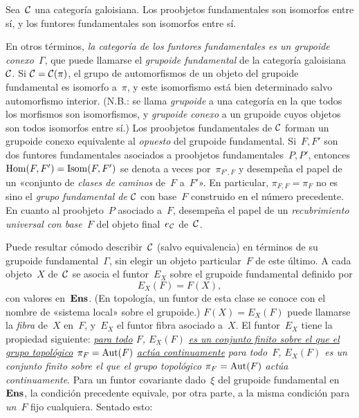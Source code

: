 \begin{corollaire}
\label{V.5.7}
Sea~$\cal{C}$ una categoría galoisiana. Los proobjetos fundamentales son
isomorfos entre sí, y los funtores fundamentales son isomorfos entre sí.
\end{corollaire}

En otros términos, \emph{la categoría de los funtores fundamentales es un
grupoide conexo~$\Gamma$},
\label{indnot:ef}%
que puede llamarse el \emph{grupoide fundamental}
%
de la categoría galoisiana~$\cal{C}$. Si $\cal{C}=\cal{C}(\pi)$, el grupo
de automorfismos de un objeto del grupoide fundamental es isomorfo a~$\pi$,
y este isomorfismo está bien determinado salvo automorfismo interior.
(N.B.: se llama \emph{grupoide} a una categoría en la que todos los
morfismos son isomorfismos, y \emph{grupoide conexo} a un grupoide cuyos
objetos son todos isomorfos entre sí.) Los proobjetos fundamentales de
$\cal{C}$ forman un grupoide conexo equivalente al \emph{opuesto} del
grupoide fundamental. Si~$F,F'$ son dos funtores fundamentales asociados a
proobjetos fundamentales~$P,P'$, entonces
$\Hom(F,F')=\Isom(F,F')$ se denota a veces por~$\pi_{F',F}$ y desempeña el
papel de un «conjunto de \emph{clases de caminos} de~$F$ a~$F'$». En
particular, $\pi_{F,F}=\pi_F$ no es sino el \emph{grupo fundamental de
$\cal{C}$} con base~$F$ construido en el número precedente. En cuanto al
proobjeto~$P$ asociado a~$F$, desempeña el papel de un \emph{recubrimiento
universal con base~$F$} del objeto final~$e_{\cal{C}}$ de~$\cal{C}$.

Puede resultar cómodo describir~$\cal{C}$ (salvo equivalencia) en términos
de su grupoide fundamental~$\Gamma$, sin elegir un objeto particular~$F$
de este último. A cada objeto~$X$ de~$\cal{C}$ se asocia el funtor~$E_X$
sobre el grupoide fundamental definido por
$$
E_X(F)=F(X),
$$
con valores en~$\Ens$. (En topología, un funtor de esta clase se conoce con
el nombre de «sistema local» sobre el grupoide.) $F(X)=E_X(F)$ puede
llamarse la \emph{fibra} de~$X$ en~$F$, y~$E_X$ el funtor fibra asociado
a~$X$. El funtor~$E_X$ tiene la propiedad siguiente:
{\emph{\underline{para todo} $F$, $E_X(F)$
\underline{es un conjunto finito sobre el que el grupo topológico}
$\pi_F=\Aut(F)$ \underline{actúa continuamente}}}
{\emph{para todo~$F$, $E_X(F)$ es un conjunto finito sobre el que el grupo
topológico $\pi_F=\Aut(F)$ actúa continuamente}}.
Para un funtor covariante dado~$\xi$ del grupoide fundamental en~$\Ens$, la
condición precedente equivale, por otra parte, a la misma condición para
\emph{un}~$F$ fijo cualquiera. Sentado esto:
